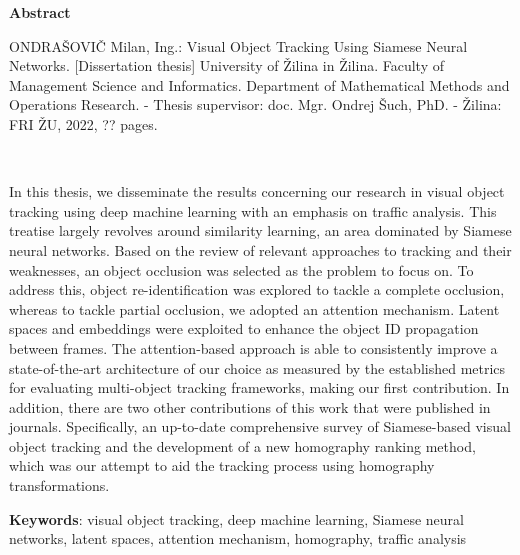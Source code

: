 \thispagestyle{plain}

\begin{center}
    \Large{\textbf{Abstract}}
\end{center}

\noindent ONDRAŠOVIČ Milan, Ing.: Visual Object Tracking Using Siamese Neural Networks.
    [Dissertation thesis] University of Žilina in Žilina. Faculty of Management Science and Informatics. Department of Mathematical Methods and Operations Research. - Thesis supervisor: doc. Mgr. Ondrej Šuch, PhD. - Žilina: FRI ŽU, 2022, ?? pages.

\


\noindent In this thesis, we disseminate the results concerning our research in visual object tracking using deep machine learning with an emphasis on traffic analysis. This treatise largely revolves around similarity learning, an area dominated by Siamese neural networks. Based on the review of relevant approaches to tracking and their weaknesses, an object occlusion was selected as the problem to focus on. To address this, object re-identification was explored to tackle a complete occlusion, whereas to tackle partial occlusion, we adopted an attention mechanism. Latent spaces and embeddings were exploited to enhance the object ID propagation between frames. The attention-based approach is able to consistently improve a state-of-the-art architecture of our choice as measured by the established metrics for evaluating multi-object tracking frameworks, making our first contribution. In addition, there are two other contributions of this work that were published in journals. Specifically, an up-to-date comprehensive survey of Siamese-based visual object tracking and the development of a new homography ranking method, which was our attempt to aid the tracking process using homography transformations.

\noindent \textbf{Keywords}: visual object tracking, deep machine learning, Siamese neural networks, latent spaces, attention mechanism, homography, traffic analysis
